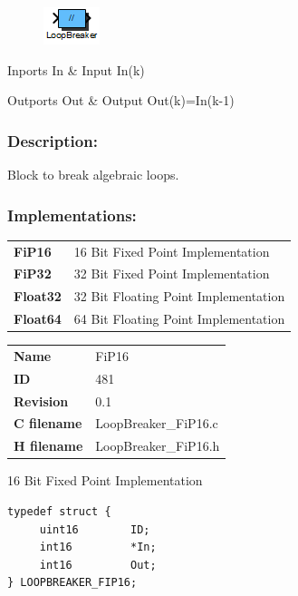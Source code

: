 \label{block:LoopBreaker}
\begin{figure}[H]\includegraphics{LoopBreaker}\end{figure} 

\begin{XtoCtabular}{Inports}
In & Input In(k)\tabularnewline
\hline
\end{XtoCtabular}


\begin{XtoCtabular}{Outports}
Out & Output Out(k)=In(k-1)\tabularnewline
\hline
\end{XtoCtabular}

\subsubsection*{Description:}
Block to break algebraic loops.


\subsubsection*{Implementations:}
\begin{tabular}{l l}
\textbf{FiP16} & 16 Bit Fixed Point Implementation\tabularnewline
\textbf{FiP32} & 32 Bit Fixed Point Implementation\tabularnewline
\textbf{Float32} & 32 Bit Floating Point Implementation\tabularnewline
\textbf{Float64} & 64 Bit Floating Point Implementation\tabularnewline
\end{tabular}

\nopagebreak[0]
\begin{tabular}{l l}
\textbf{Name} & FiP16 \tabularnewline
\textbf{ID} & 481 \tabularnewline
\textbf{Revision} & 0.1 \tabularnewline
\textbf{C filename} & LoopBreaker\_FiP16.c \tabularnewline
\textbf{H filename} & LoopBreaker\_FiP16.h \tabularnewline
\end{tabular}
\vspace{1ex}

16 Bit Fixed Point Implementation

\begin{lstlisting}
typedef struct {
     uint16        ID;
     int16         *In;
     int16         Out;
} LOOPBREAKER_FIP16;
\end{lstlisting}

